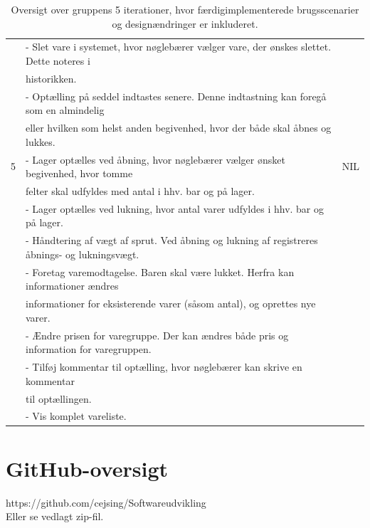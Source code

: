 \documentclass[]{article}
\begin{document}
\begin{table}[!h]
\begin{tabular}{|l|l|l|}
  & - Slet vare i systemet, hvor nøglebærer vælger vare, der ønskes slettet. Dette noteres i & \\
  & historikken. & \\
  & - Optælling på seddel indtastes senere. Denne indtastning kan foregå som en almindelig & \\ 
  & eller hvilken som helst anden begivenhed, hvor der både skal åbnes og lukkes. &  \\ \hline
5 & - Lager optælles ved åbning, hvor nøglebærer vælger ønsket begivenhed, hvor tomme & NIL \\
  & felter skal udfyldes med antal i hhv. bar og på lager. & \\
  & - Lager optælles ved lukning, hvor antal varer udfyldes i hhv. bar og på lager. & \\
  & - Håndtering af vægt af sprut. Ved åbning og lukning af registreres åbnings- og lukningsvægt. & \\
  & - Foretag varemodtagelse. Baren skal være lukket. Herfra kan informationer ændres & \\
  & informationer for eksisterende varer (såsom antal), og oprettes nye varer. & \\
  & - Ændre prisen for varegruppe. Der kan ændres både pris og information for varegruppen. & \\
  & - Tilføj kommentar til optælling, hvor nøglebærer kan skrive en kommentar & \\
  & til optællingen. & \\
  & - Vis komplet vareliste. &  \\ \hline
\end{tabular}
\caption[Oversigt over delafleveringer]{Oversigt over gruppens 5 iterationer, hvor færdigimplementerede brugsscenarier og designændringer er inkluderet.}
\label{Delafleveringer}
\end{table}

\newpage


\section{GitHub-oversigt}
https://github.com/cejsing/Softwareudvikling \\
Eller se vedlagt zip-fil.
\end{document}
